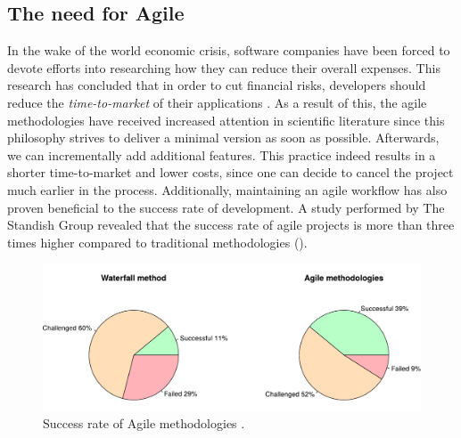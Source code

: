 
\subsection{The need for Agile}
In the wake of the world economic crisis, software companies have been forced to devote efforts into researching how they can reduce their overall expenses. This research has concluded that in order to cut financial risks, developers should reduce the \emph{time-to-market} of their applications \cite{ionel2009}. As a result of this, the agile methodologies have received increased attention in scientific literature since this philosophy strives to deliver a minimal version as soon as possible. Afterwards, we can incrementally add additional features. This practice indeed results in a shorter time-to-market and lower costs, since one can decide to cancel the project much earlier in the process. Additionally, maintaining an agile workflow has also proven beneficial to the success rate of development. A study performed by The Standish Group revealed that the success rate of agile projects is more than three times higher compared to traditional methodologies ().

\begin{figure}[htbp!]
	\centering
	\includegraphics[width=\textwidth]{assets/charts/agile-success-rate.pdf}
	\caption{Success rate of Agile methodologies \cite{standish2015chaos}.}
	\label{fig:agile-success-rate}
\end{figure}